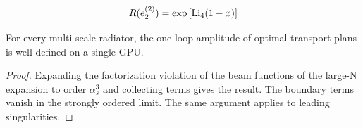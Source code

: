 \begin{equation}
  R(e_2^{(2)}) = \exp\left[\mathrm{Li}_{4}(1 - x)\right]
  \label{eq:1}
\end{equation}

\begin{theorem}[Resummation]\label{thm:1}
For every multi-scale radiator, the one-loop amplitude of optimal
transport plans is well defined on a single GPU.
\end{theorem}

\begin{proof}
Expanding the factorization violation of the beam functions of the
large-N expansion to order $\alpha_s^3$ and collecting terms gives the
result. The boundary terms vanish in the strongly ordered limit. The
same argument applies to leading singularities.
\end{proof}

